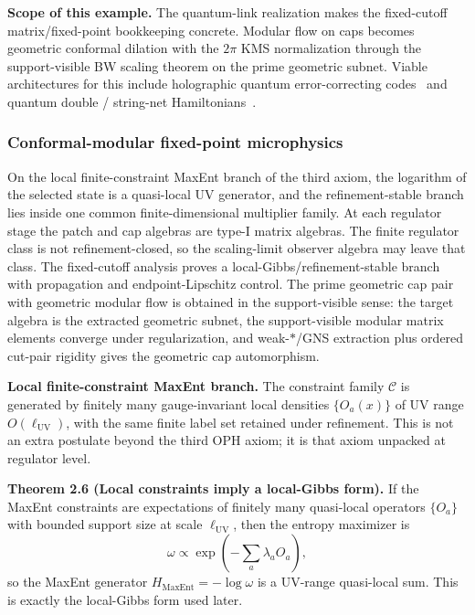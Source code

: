 \textbf{Scope of this example.} The quantum-link realization makes the fixed-cutoff matrix/fixed-point bookkeeping concrete. Modular flow on caps becomes geometric conformal dilation with the \(2\pi\) KMS normalization through the support-visible BW scaling theorem on the prime geometric subnet. Viable architectures for this include holographic quantum error-correcting codes~\cite{pastawski15} and quantum double / string-net Hamiltonians~\cite{levinWen05}.

\subsubsection{Conformal-modular fixed-point microphysics}\label{27-conformal-modular-fixed-point-microphysics-cmfp}

On the local finite-constraint MaxEnt branch of the third axiom, the logarithm of the selected state is a quasi-local UV generator, and the refinement-stable branch lies inside one common finite-dimensional multiplier family. At each regulator stage the patch and cap algebras are type-I matrix algebras. The finite regulator class is not refinement-closed, so the scaling-limit observer algebra may leave that class. The fixed-cutoff analysis proves a local-Gibbs/refinement-stable branch with propagation and endpoint-Lipschitz control. The prime geometric cap pair with geometric modular flow is obtained in the support-visible sense: the target algebra is the extracted geometric subnet, the support-visible modular matrix elements converge under regularization, and weak-\(*\)/GNS extraction plus ordered cut-pair rigidity gives the geometric cap automorphism.

\textbf{Local finite-constraint MaxEnt branch.} The constraint family \(\mathcal C\) is generated by finitely many gauge-invariant local densities \(\{O_a(x)\}\) of UV range \(O(\ell_{\mathrm{UV}})\), with the same finite label set retained under refinement. This is not an extra postulate beyond the third OPH axiom; it is that axiom unpacked at regulator level.

\textbf{Theorem 2.6 (Local constraints imply a local-Gibbs form).} If the MaxEnt constraints are expectations of finitely many quasi-local operators \(\{O_a\}\) with bounded support size at scale \(\ell_{\mathrm{UV}}\), then the entropy maximizer is
\[
\omega \propto \exp\!\left(-\sum_a \lambda_a O_a\right),
\]
so the MaxEnt generator \(H_{\mathrm{MaxEnt}}=-\log\omega\) is a UV-range quasi-local sum. This is exactly the local-Gibbs form used later.

